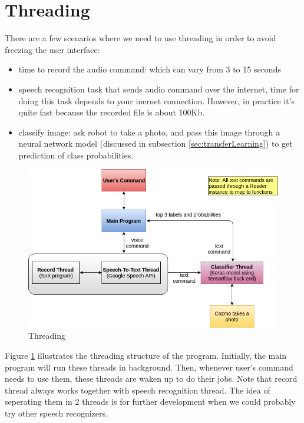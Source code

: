 \section{Threading}
There are a few scenarios where we need to use threading in order to avoid freezing the user interface:
\begin{itemize}
	\item time to record the audio command: which can vary from 3 to 15 seconds
	\item speech recognition task that sends audio command over the internet, time for doing this task depends to your inernet connection. However, in practice it's quite fast because the recorded file is about 100Kb.
	\item classify image: ask robot to take a photo, and pass this image through a neural network model (discussed in subsection \ref{sec:transferLearning}) to get prediction of class probabilities.
\end{itemize}

\begin{figure}[!htb]
	\centering
	\includegraphics[width=0.9\hsize]{./figures/threads}
	\caption{Threading}
	\label{fig:threads}
\end{figure}

Figure \ref{fig:threads} illustrates the threading structure of the program. Initially, the main program will run these threads in background. Then, whenever user's command needs to use them, these threads are waken up to do their jobs. Note that record thread always works together with speech recognition thread. The idea of seperating them in 2 threads is for further development when we could probably try other speech recognizers.